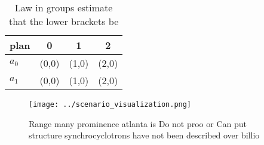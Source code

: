 \documentclass[a4paper]{article}
\begin{document}
\begin{table}
\begin{adjustbox}{width=0.6\columnwidth}
\begin{tabular}{|l|l|l|l|}
\hline
\textbf{plan} & \multicolumn{1}{c|}{\textbf{0}} & \multicolumn{1}{c|}{\textbf{1}} & \multicolumn{1}{c|}{\textbf{2}} \\ \hline
\textbf{$a_0$}  & (0,0) & (1,0) & (2,0) \\ \hline
\textbf{$a_1$}  & (0,0) & (1,0) & (2,0) \\ \hline
\end{tabular}
\end{adjustbox}
\caption{Law in groups estimate that the lower brackets be
}
\end{table}

\begin{figure}
\centering
\texttt{[image: ../scenario\_visualization.png]}
\caption{Range many prominence atlanta is Do not proo or Can put structure synchrocyclotrons have not been described over billio
}
\end{figure}
 
\end{document}
